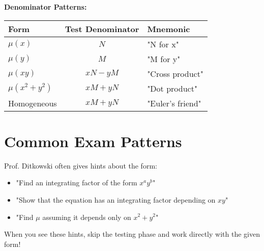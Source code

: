 \documentclass[12pt]{article}
\begin{document}
\begin{examtip}
\textbf{Denominator Patterns:}
\begin{center}
\begin{tabular}{|l|c|l|}
\hline
\textbf{Form} & \textbf{Test Denominator} & \textbf{Mnemonic} \\
\hline
$\mu(x)$ & $N$ & "N for x" \\
$\mu(y)$ & $M$ & "M for y" \\
$\mu(xy)$ & $xN - yM$ & "Cross product" \\
$\mu(x^2+y^2)$ & $xM + yN$ & "Dot product" \\
Homogeneous & $xM + yN$ & "Euler's friend" \\
\hline
\end{tabular}
\end{center}
\end{examtip}

\section{Common Exam Patterns}

\begin{warning}
Prof. Ditkowski often gives hints about the form:
\begin{itemize}
    \item "Find an integrating factor of the form $x^a y^b$"
    \item "Show that the equation has an integrating factor depending on $xy$"
    \item "Find $\mu$ assuming it depends only on $x^2 + y^2$"
\end{itemize}
When you see these hints, skip the testing phase and work directly with the given form!
\end{warning}
\end{document}
